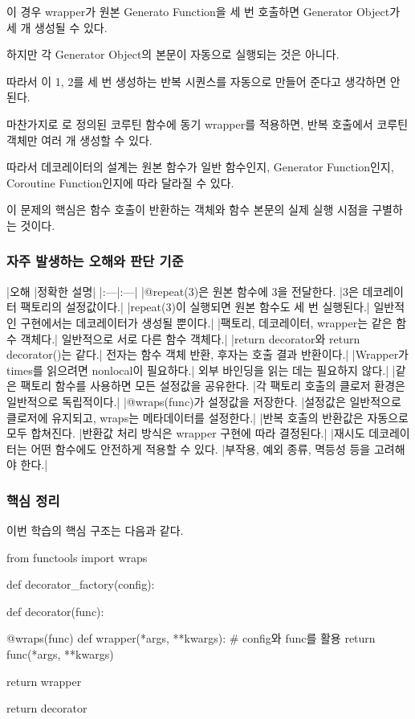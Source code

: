 이 경우 wrapper가 원본 Generato Function을 세 번 호출하면 Generator Object가 세 개 생성될 수 있다.

하지만 각 Generator Object의 본문이 자동으로 실행되는 것은 아니다.

따라서 이 1, 2를 세 번 생성하는 반복 시퀀스를 자동으로 만들어 준다고 생각하면 안 된다.

마찬가지로 로 정의된 코루틴 함수에 동기 wrapper를 적용하면, 반복 호출에서 코루틴 객체만 여러 개 생성할 수 있다.

따라서 데코레이터의 설계는 원본 함수가 일반 함수인지, Generator Function인지, Coroutine Function인지에 따라 달라질 수 있다.

이 문제의 핵심은 함수 호출이 반환하는 객체와 함수 본문의 실제 실행 시점을 구별하는 것이다.

\subsubsection{자주 발생하는 오해와 판단 기준}

\begin{dhktable}
|오해	|정확한 설명|
|:---|:---|
|@repeat(3)은 원본 함수에 3을 전달한다.	|3은 데코레이터 팩토리의 설정값이다.|
|repeat(3)이 실행되면 원본 함수도 세 번 실행된다.|	일반적인 구현에서는 데코레이터가 생성될 뿐이다.|
|팩토리, 데코레이터, wrapper는 같은 함수 객체다.|	일반적으로 서로 다른 함수 객체다.|
|return decorator와 return decorator()는 같다.|	전자는 함수 객체 반환, 후자는 호출 결과 반환이다.|
|Wrapper가 times를 읽으려면 nonlocal이 필요하다.|	외부 바인딩을 읽는 데는 필요하지 않다.|
|같은 팩토리 함수를 사용하면 모든 설정값을 공유한다.	|각 팩토리 호출의 클로저 환경은 일반적으로 독립적이다.|
|@wraps(func)가 설정값을 저장한다.	|설정값은 일반적으로 클로저에 유지되고, wraps는 메타데이터를 설정한다.|
|반복 호출의 반환값은 자동으로 모두 합쳐진다.	|반환값 처리 방식은 wrapper 구현에 따라 결정된다.|
|재시도 데코레이터는 어떤 함수에도 안전하게 적용할 수 있다.	|부작용, 예외 종류, 멱등성 등을 고려해야 한다.|
\end{dhktable}

\subsubsection{핵심 정리}

이번 학습의 핵심 구조는 다음과 같다.

\begin{dhkcode}
from functools import wraps

def decorator_factory(config):

    def decorator(func):

        @wraps(func)
        def wrapper(*args, **kwargs):
            # config와 func를 활용
            return func(*args, **kwargs)

        return wrapper

    return decorator
\end{dhkcode}

